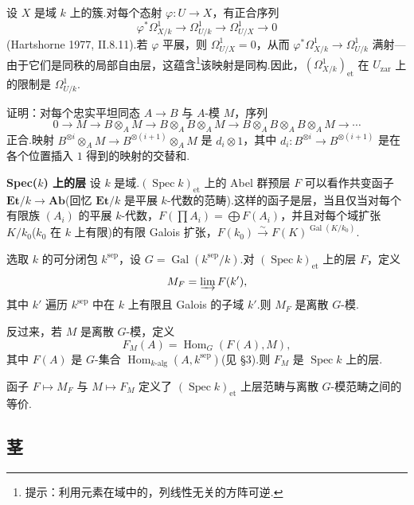 \begin{example}\label{ex:6.11}
设 $X$ 是域 $k$ 上的簇.对每个态射 $\varphi \colon U \to X$，有正合序列
\[
\varphi^{*}\Omega^{1}_{X/k} \to \Omega^{1}_{U/k} \to \Omega^{1}_{U/X} \to 0
\]
(Hartshorne 1977, II.8.11).若 $\varphi$ 平展，则 $\Omega^{1}_{U/X} = 0$，从而 $\varphi^{*}\Omega^{1}_{X/k} \to \Omega^{1}_{U/k}$ 满射---由于它们是同秩的局部自由层，这蕴含\footnote{提示：利用元素在域中的，列线性无关的方阵可逆.}该映射是同构.因此，$(\Omega^{1}_{X/k})_{\mathrm{et}}$ 在 $U_{\mathrm{zar}}$ 上的限制是 $\Omega^{1}_{U/k}$.
\end{example}

\begin{exercise}\label{exc:6.12}
证明：对每个忠实平坦同态 $A \to B$ 与 $A$-模 $M$，序列
\[
0 \to M \to B \otimes_{A} M \to B \otimes_{A} B \otimes_{A} M \to B \otimes_{A} B \otimes_{A} B \otimes_{A} M \to \cdots
\]
正合.映射 $B^{\otimes i} \otimes_{A} M \to B^{\otimes (i+1)} \otimes_{A} M$ 是 $d_i \otimes 1$，其中 $d_i \colon B^{\otimes i} \to B^{\otimes (i+1)}$ 是在各个位置插入 $1$ 得到的映射的交替和.
\end{exercise}

\textbf{Spec($k$) 上的层} 设 $k$ 是域.$(\operatorname{Spec} k)_{\mathrm{et}}$ 上的 Abel 群预层 $F$ 可以看作共变函子 $\mathbf{Et}/k \to \mathbf{Ab}$(回忆 $\mathbf{Et}/k$ 是平展 $k$-代数的范畴).这样的函子是层，当且仅当对每个有限族 $(A_i)$ 的平展 $k$-代数，$F(\prod A_i) = \bigoplus F(A_i)$，并且对每个域扩张 $K/k_0$($k_0$ 在 $k$ 上有限)的有限 Galois 扩张，$F(k_0) \xrightarrow{\sim} F(K)^{\operatorname{Gal}(K/k_0)}$.

选取 $k$ 的可分闭包 $k^{\mathrm{sep}}$，设 $G = \operatorname{Gal}(k^{\mathrm{sep}}/k)$.对 $(\operatorname{Spec} k)_{\mathrm{et}}$ 上的层 $F$，定义
\[
M_F = \varinjlim F(k'),
\]
其中 $k'$ 遍历 $k^{\mathrm{sep}}$ 中在 $k$ 上有限且 Galois 的子域 $k'$.则 $M_F$ 是离散 $G$-模.

反过来，若 $M$ 是离散 $G$-模，定义
\[
F_M(A) = \operatorname{Hom}_G(F(A), M),
\]
其中 $F(A)$ 是 $G$-集合 $\operatorname{Hom}_{k\text{-alg}}(A, k^{\mathrm{sep}})$(见 \S 3).则 $F_M$ 是 $\operatorname{Spec} k$ 上的层.

函子 $F \mapsto M_F$ 与 $M \mapsto F_M$ 定义了 $(\operatorname{Spec} k)_{\mathrm{et}}$ 上层范畴与离散 $G$-模范畴之间的等价.

\subsection*{茎}

